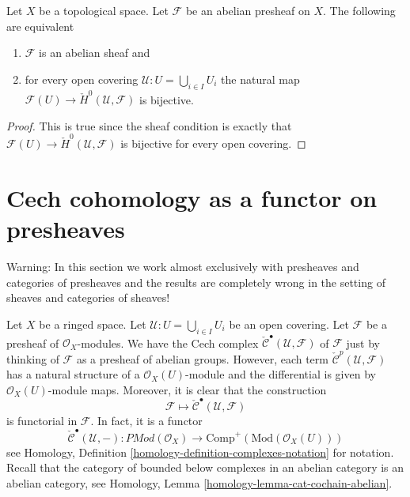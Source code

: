 \begin{lemma}
\label{lemma-cech-h0}
Let $X$ be a topological space.
Let $\mathcal{F}$ be an abelian presheaf on $X$.
The following are equivalent
\begin{enumerate}
\item $\mathcal{F}$ is an abelian sheaf and
\item for every open covering $\mathcal{U} : U = \bigcup_{i \in I} U_i$
the natural map
$\mathcal{F}(U) \to \check{H}^0(\mathcal{U}, \mathcal{F})$
is bijective.
\end{enumerate}
\end{lemma}

\begin{proof}
This is true since the sheaf condition is exactly that
$\mathcal{F}(U) \to \check{H}^0(\mathcal{U}, \mathcal{F})$
is bijective for every open covering.
\end{proof}






\section{Cech cohomology as a functor on presheaves}
\label{section-cech-functor}

\noindent
Warning: In this section we work almost exclusively with presheaves and
categories of presheaves and the results are completely wrong in the
setting of sheaves and categories of sheaves!

\medskip\noindent
Let $X$ be a ringed space.
Let $\mathcal{U} : U = \bigcup_{i \in I} U_i$ be an open covering.
Let $\mathcal{F}$ be a presheaf of $\mathcal{O}_X$-modules.
We have the Cech complex
$\check{\mathcal{C}}^\bullet(\mathcal{U}, \mathcal{F})$
of $\mathcal{F}$ just by thinking of $\mathcal{F}$
as a presheaf of abelian groups. However, each term
$\check{\mathcal{C}}^p(\mathcal{U}, \mathcal{F})$ has a natural
structure of a $\mathcal{O}_X(U)$-module and the differential is given by
$\mathcal{O}_X(U)$-module maps. Moreover, it is clear that the
construction
$$
\mathcal{F} \longmapsto \check{\mathcal{C}}^\bullet(\mathcal{U}, \mathcal{F})
$$
is functorial in $\mathcal{F}$. In fact, it is a functor
\begin{equation}
\label{equation-cech-functor}
\check{\mathcal{C}}^\bullet(\mathcal{U}, -) :
\textit{PMod}(\mathcal{O}_X)
\longrightarrow
\text{Comp}^{+}(\text{Mod}(\mathcal{O}_X(U)))
\end{equation}
see Homology, Definition \ref{homology-definition-complexes-notation}
for notation. Recall that the category of bounded below complexes
in an abelian category is an abelian category, see
Homology, Lemma \ref{homology-lemma-cat-cochain-abelian}.

